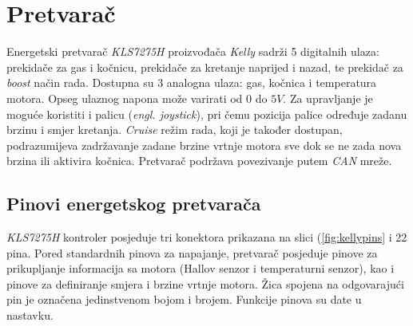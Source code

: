 \section{Pretvarač}

\qquad Energetski pretvarač \textit{KLS7275H} proizvođača \textit{Kelly} sadrži 5 digitalnih ulaza: prekidače za gas i kočnicu, prekidače za kretanje naprijed i nazad, te prekidač za \textit{boost} način rada. Dostupna su 3 analogna ulaza: gas, kočnica i temperatura motora. Opseg ulaznog napona može varirati od $0$ do $5V$. Za upravljanje je moguće koristiti i palicu (\textit{engl. joystick}), pri čemu pozicija palice određuje zadanu brzinu i smjer kretanja. \textit{Cruise} režim rada, koji je također dostupan, podrazumijeva zadržavanje zadane brzine vrtnje motora sve dok se ne zada nova brzina ili aktivira kočnica. Pretvarač podržava povezivanje putem \textit{CAN} mreže.

\subsection{Pinovi energetskog pretvarača}

\qquad \textit{KLS7275H} kontroler posjeduje tri konektora prikazana na slici (\ref{fig:kellypins} i 22 pina. Pored standardnih pinova za napajanje, pretvarač posjeduje pinove za prikupljanje informacija sa motora (Hallov senzor i temperaturni senzor), kao i pinove za definiranje smjera i brzine vrtnje motora. Žica spojena na odgovarajući pin je označena jedinstvenom bojom i brojem. Funkcije pinova su date u nastavku.

